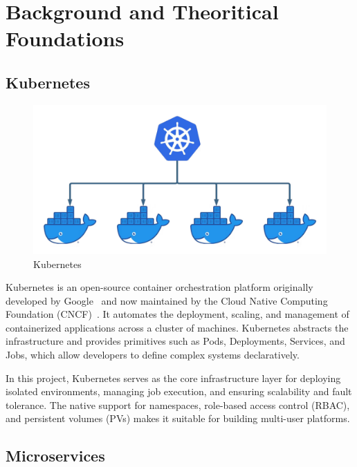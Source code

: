 \chapter{Background and Theoritical Foundations}
\label{Chapter-Background}

\section{Kubernetes}

\begin{figure}[h!]
  \centering
  \includegraphics[width=1\textwidth]{Images/2024-04-10-k8s-vs-docker.png}
  \caption{Kubernetes}
  \label{fig:kubernetes}
\end{figure}

Kubernetes is an open-source container orchestration platform originally developed by Google~\cite{kubernetes-docs} 
and now maintained by the Cloud Native Computing Foundation (CNCF)~\cite{cncf-kubernetes}. It automates the deployment, 
scaling, and management of containerized applications across a cluster of machines. Kubernetes abstracts the infrastructure 
and provides primitives such as Pods, Deployments, Services, and Jobs, which allow developers to define complex systems 
declaratively.


In this project, Kubernetes serves as the core infrastructure layer for deploying isolated environments, managing job execution, 
and ensuring scalability and fault tolerance. The native support for namespaces, role-based access control (RBAC), and persistent 
volumes (PVs) makes it suitable for building multi-user platforms.
\section{Microservices}


